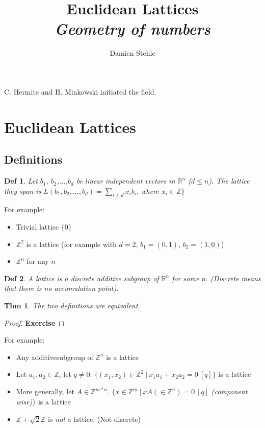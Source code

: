 \documentclass[11pt]{article}
\title{Euclidean Lattices \\ \textit{Geometry of numbers}}
\author{Damien Stehle}
\newtheorem{definition}{Def}
\newtheorem{theorem}{Thm}
\begin{document}
 

\maketitle

C. Hermite and H. Minkowski initiated the field.

\section{Euclidean Lattices}
\subsection{Definitions}

\begin{definition}
Let $b_1$, $b_2$,...,$b_d$ be linear independent vectors in $\mathbb{R}^n$ ($d \leq n$). The lattice they span is $L(b_1,b_2,...,b_d)= \sum_{i \leq d} x_i b_i$, where $x_i \in \mathbb{Z} \}$
\end{definition}

For example:
\begin{itemize}
\item Trivial lattice $\{0\}$
\item $\mathbb{Z}^2$ is a lattice (for example with $d=2$, $b_1=(0,1)$, $b_2=(1,0)$)
\item $\mathbb{Z}^n$ for any $n$
\end{itemize}

\begin{definition}
A lattice is a discrete additive subgroup of $\mathbb{R}^n$ for some $n$. (Discrete means that there is no accumulation point).
\end{definition}

\begin{theorem}
The two definitions are equivalent.
\end{theorem}

\begin{proof}
\textbf{Exercise}
\end{proof}

For example:
\begin{itemize}
\item Any additivesubgroup of $\mathbb{Z}^n$ is a lattice
\item Let $a_1, a_2 \in \mathbb{Z}$, let $q \neq 0$. $\{ (x_1,x_2) \in \mathbb{Z}^2 \ | \ x_1 a_1+x_2 a_2 = 0 \ [q]  \}$ is a lattice
\item More generally, let $A \in \mathbb{Z}^{m*n}$. $\{ x \in \mathbb{Z}^m \ | \ xA (\in \mathbb{Z}^n)=0 \ [q]$ \textit{(component wise)}$\}$ is a lattice
\item $\mathbb{Z}+\sqrt{2} \mathbb{Z}$ is \textit{not} a lattice. (Not discrete)
\end{itemize}
\end{document}
